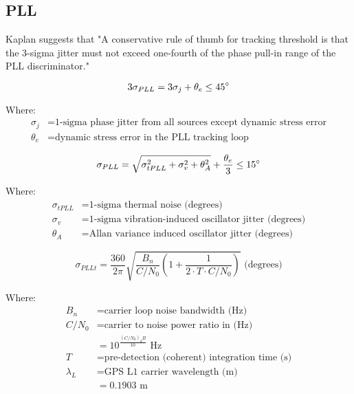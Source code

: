 \subsection{PLL}
Kaplan suggests that "A conservative rule of thumb for tracking threshold is that the 3-sigma jitter must not exceed one-fourth of the phase pull-in range of the PLL discriminator." %

\begin{equation}
3 \sigma_{PLL} = 3 \sigma_j +\theta_e \leq 45 \degree
\end{equation}

Where:
\begin{align*}
\sigma_j &= \text{1-sigma phase jitter from all sources except dynamic stress error} \\
\theta_e &= \text{dynamic stress error in the PLL tracking loop}
\end{align*}


\begin{equation}
\sigma_{PLL} = \sqrt{\sigma^2_{tPLL} + \sigma^2_v+ \theta^2_A} + \frac{\theta_e}{3} \leq 15 \degree 
\end{equation}

Where:
\begin{align*}
\sigma_{tPLL} &= \text{1-sigma thermal noise (degrees)}\\
\sigma_v &= \text{1-sigma vibration-induced oscillator jitter (degrees)}\\
\theta_A &= \text{Allan variance induced oscillator jitter (degrees)}
\end{align*}


\begin{equation}
\sigma_{PLLt} = \frac{360}{2 \pi} \sqrt{\frac{B_n}{C/N_0}(1+\frac{1}{2 \cdot T \cdot C/N_0})} \text{ (degrees)}
\end{equation}

Where:
\begin{align*}
B_n &= \text{carrier loop noise bandwidth (Hz)} \\
C/N_0 &= \text{carrier to noise power ratio in (Hz)} \\
&=10^\frac{(C/N_0)_dB}{10} \text{ Hz}\\
T &= \text{pre-detection (coherent) integration time (s)} \\
\lambda_L &= \text{GPS L1 carrier wavelength (m)}\\
&= 0.1903 \text{ m}
\end{align*}


